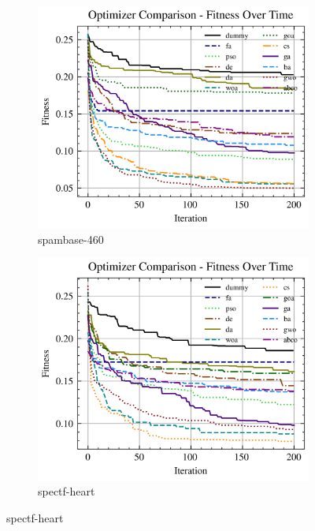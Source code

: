 \begin{figure}[htp]
    \centering
    \begin{subfigure}[htp]{0.45\textwidth}
        \includegraphics[width=\textwidth]{imagenes/fitness_charts/img/real/spambase-460/optimizers_fitness_knn.png}
        \caption{spambase-460}
    \end{subfigure}
    \begin{subfigure}[htp]{0.45\textwidth}
        \includegraphics[width=\textwidth]{imagenes/fitness_charts/img/real/spectf-heart/optimizers_fitness_knn.png}
        \caption{spectf-heart}

\end{subfigure}
\end{figure}
